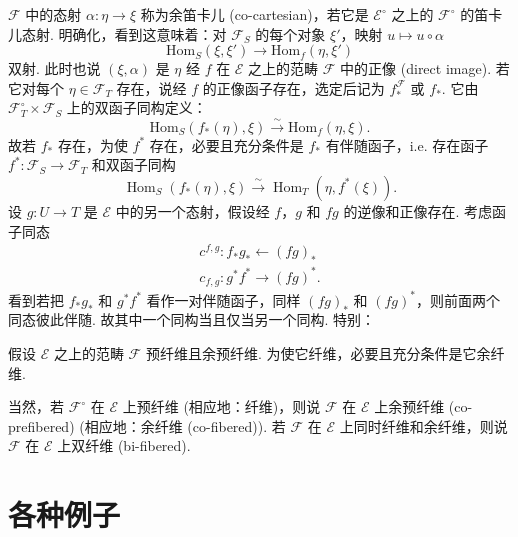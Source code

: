 $\mathcal{F}$ 中的态射 $\alpha \colon \eta \to \xi$ 称为余笛卡儿 (co-cartesian)，若它是 $\mathcal{E}^{\circ}$ 之上的 $\mathcal{F}^{\circ}$ 的笛卡儿态射. 明确化，看到这意味着：对 $\mathcal{F}_S$ 的每个对象 $\xi'$，映射 $u \mapsto u \circ \alpha$
\[
\mathrm{Hom}_S(\xi, \xi') \longrightarrow \mathrm{Hom}_f(\eta, \xi')
\]
双射. 此时也说 $(\xi, \alpha)$ 是 $\eta$ 经 $f$ 在 $\mathcal{E}$ 之上的范畴 $\mathcal{F}$ 中的正像 (direct image). 若它对每个 $\eta \in \mathcal{F}_T$ 存在，说经 $f$ 的正像函子存在，选定后记为 $f_{*}^{\mathcal{F}}$ 或 $f_{*}$. 它由 $\mathcal{F}_T^{\circ} \times \mathcal{F}_S$ 上的双函子同构定义：
\[
\mathrm{Hom}_S(f_{*}(\eta), \xi) \stackrel{\sim}{\longrightarrow} \mathrm{Hom}_f(\eta, \xi).
\]
故若 $f_{*}$ 存在，为使 $f^{*}$ 存在，必要且充分条件是 $f_{*}$ 有伴随函子，i.e. 存在函子 $f^{*} \colon \mathcal{F}_S \to \mathcal{F}_T$ 和双函子同构
\[
\operatorname{Hom}_S(f_{*}(\eta), \xi) \xrightarrow{\sim} \operatorname{Hom}_T(\eta, f^{*}(\xi)).
\]
设 $g \colon U \to T$ 是 $\mathcal{E}$ 中的另一个态射，假设经 $f$，$g$ 和 $fg$ 的逆像和正像存在. 考虑函子同态
\[
\begin{array}{l}
c^{f,g} \colon f_{*} g_{*} \longleftarrow (fg)_{*} \\
c_{f,g} \colon g^{*} f^{*} \longrightarrow (fg)^{*}.
\end{array}
\]
看到若把 $f_{*} g_{*}$ 和 $g^{*} f^{*}$ 看作一对伴随函子，同样 $(fg)_{*}$ 和 $(fg)^{*}$，则前面两个同态彼此伴随. 故其中一个同构当且仅当另一个同构. 特别：

\begin{proposition}\label{prop:VI.10.1}
假设 $\mathcal{E}$ 之上的范畴 $\mathcal{F}$ 预纤维且余预纤维. 为使它纤维，必要且充分条件是它余纤维.
\end{proposition}

当然，若 $\mathcal{F}^{\circ}$ 在 $\mathcal{E}$ 上预纤维 (相应地：纤维)，则说 $\mathcal{F}$ 在 $\mathcal{E}$ 上余预纤维 (co-prefibered) (相应地：余纤维 (co-fibered)). 若 $\mathcal{F}$ 在 $\mathcal{E}$ 上同时纤维和余纤维，则说 $\mathcal{F}$ 在 $\mathcal{E}$ 上双纤维 (bi-fibered).

\section{各种例子}

